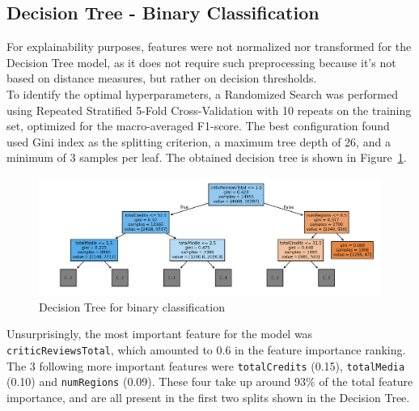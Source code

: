 \subsection{Decision Tree - Binary Classification}
For explainability purposes, features were not normalized nor transformed for the Decision Tree model,
as it does not require such preprocessing because it's not based on distance measures, but rather on
decision thresholds.\\
To identify the optimal hyperparameters, a Randomized Search was performed
using Repeated Stratified 5-Fold Cross-Validation with 10 repeats on the training set, optimized for
the macro-averaged F1-score.
The best configuration found used Gini index as the splitting criterion,
a maximum tree depth of 26, and a minimum of 3 samples per leaf.
The obtained decision tree is shown in Figure~\ref{fig:binary_dt}.
\begin{figure}[H]
    \centering
    \includegraphics[width=0.9\linewidth]{plots/binary_dt.png}
    \captionsetup{justification=centering, width=0.9\linewidth}
    \caption{Decision Tree for binary classification}
    \label{fig:binary_dt}
\end{figure}

Unsurprisingly, the most important feature for the model was \texttt{criticReviewsTotal},
which amounted to 0.6 in the feature importance ranking. The 3 following more important
features were \texttt{totalCredits} (0.15), \texttt{totalMedia} (0.10) and \texttt{numRegions} (0.09).
These four take up around 93\% of the total feature importance, and are all present in the first
two splits shown in the Decision Tree.

